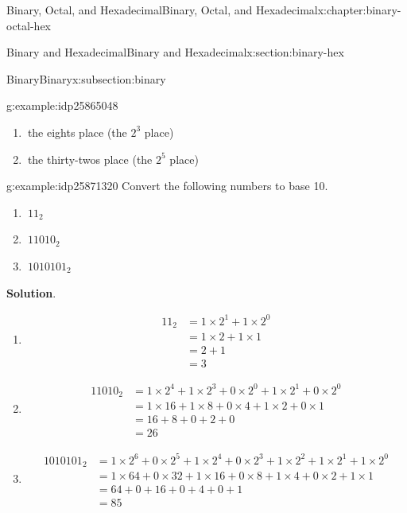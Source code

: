 \documentclass[twoside,10pt,]{book}
\newcommand{\blocktitlefont}{\relax}
\numberwithin{equation}{section}
\newcommand{\amp}{&}
\begin{document}
\begin{chapterptx}{Binary, Octal, and Hexadecimal}{}{Binary, Octal, and Hexadecimal}{}{}{x:chapter:binary-octal-hex}
\begin{sectionptx}{Binary and Hexadecimal}{}{Binary and Hexadecimal}{}{}{x:section:binary-hex}
\begin{subsectionptx}{Binary}{}{Binary}{}{}{x:subsection:binary}
\begin{example}{}{g:example:idp25865048}
\begin{enumerate}
\item{}\(\ \)the eights place (the \(2^3\) place)%
\item{}\(\ \)the thirty-twos place (the \(2^5\) place)%
\end{enumerate}
%
\end{example}
\begin{example}{}{g:example:idp25871320}%
Convert the following numbers to base 10.%
\begin{enumerate}
\item{}\(\displaystyle \ 11_2\)%
\item{}\(\displaystyle \ 11010_2\)%
\item{}\(\displaystyle \ 1010101_2\)%
\end{enumerate}
%
\par\smallskip%
\noindent\textbf{\blocktitlefont Solution}.\label{g:solution:idp25877720}{}\hypertarget{g:solution:idp25877720}{}\quad{}%
\begin{enumerate}
\item{}%
\begin{align*}
11_2 \amp = 1\times2^1+1\times2^0\\
\amp = 1\times2 +1\times 1\\
\amp = 2 + 1\\
\amp =3
\end{align*}
%
\item{}%
\begin{align*}
11010_2 \amp = 1\times 2^4+1\times2^3+0\times2^0+1\times2^1+0\times2^0\\
\amp = 1\times16+1\times8+0\times4+1\times2+0\times1\\
\amp =16+8+0+2+0\\
\amp = 26
\end{align*}
%
\item{}%
\begin{align*}
1010101_2 \amp = 1\times2^6+0\times2^5+1\times2^4+0\times2^3+1\times2^2+1\times2^1+1\times2^0\\
\amp = 1\times64+0\times32+1\times16+0\times8+1\times4+0\times2+1\times1\\
\amp = 64+0+16+0+4+0+1\\
\amp = 85
\end{align*}
%
\end{enumerate}
%
\end{example}
\end{subsectionptx}
%
%
\typeout{************************************************}
\typeout{************************************************}

\end{sectionptx}
\end{chapterptx}
\end{document}
